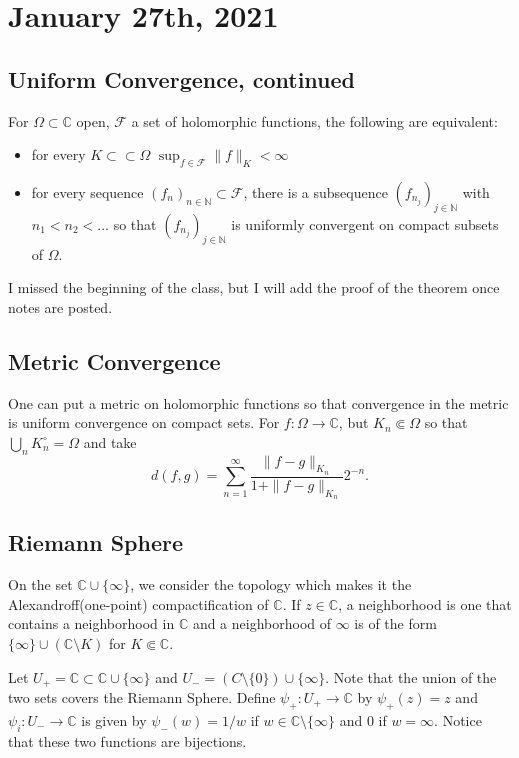 \documentclass[12pt]{scrartcl}
\newcommand{\N}{\mathbb{N}}
\newcommand{\C}{\mathbb C}
\let \mc \mathcal
\begin{document}
 \section{January 27th, 2021}
 \subsection{Uniform Convergence, continued}
 \begin{thm} For $\Omega \subset \C$ open, $\mc F$
 a set of holomorphic functions, the following are equivalent:
 \begin{itemize}
 \item for every $K \subset \subset \Omega$ $\sup_{f \in \mc F} \|f\|_K < \infty$
 \item for every sequence $(f_n)_{n \in \N} \subset \mc F$, there is a subsequence $(f_{n_j})_{j \in \N}$ with $n_1 < n_2 < \dots$ so that $(f_{n_j})_{j \in \N}$ is uniformly convergent on compact subsets of $\Omega$.
 \end{itemize}
 \end{thm}
 I missed the beginning of the class, but I will add the proof of the theorem once notes are posted.
 \subsection{Metric Convergence}
 One can put a metric on holomorphic functions so that convergence in the metric is uniform convergence on compact sets.  For $f: \Omega \to \C$, but $K_n \Subset \Omega$ so that $\bigcup_{n} K_n^\circ = \Omega$ and take 
 $$d(f, g) = \sum_{n=1}^\infty \frac{\|f - g\|_{K_n}}{1 + \|f - g\|_{K_n}} 2^{-n}.$$
 
 \subsection{Riemann Sphere}
 On the set $\C \cup \{\infty\}$, we consider the topology which makes it the Alexandroff(one-point) compactification of $\C$.  If $z \in \C$, a neighborhood is one that contains a neighborhood in $\C$ and a neighborhood of $\infty$
 is of the form $\{\infty\} \cup (\C \setminus K)$ for $K \Subset \C$.
 
Let $U_+ = \C \subset \C \cup \{\infty\}$ and $U_- = (C \setminus \{0\}) \cup \{\infty\}$.  Note that the union of the two sets covers the Riemann Sphere.  Define $\psi_+:U_+ \to \C$ by $\psi_+(z) = z$ and $\psi_i: U_- \to \C$ is given by $\psi_-(w) = 1/w$ if $w \in \C \setminus \{\infty\}$ and $0$ if $w = \infty$.  Notice that these two functions are bijections.
\end{document}
